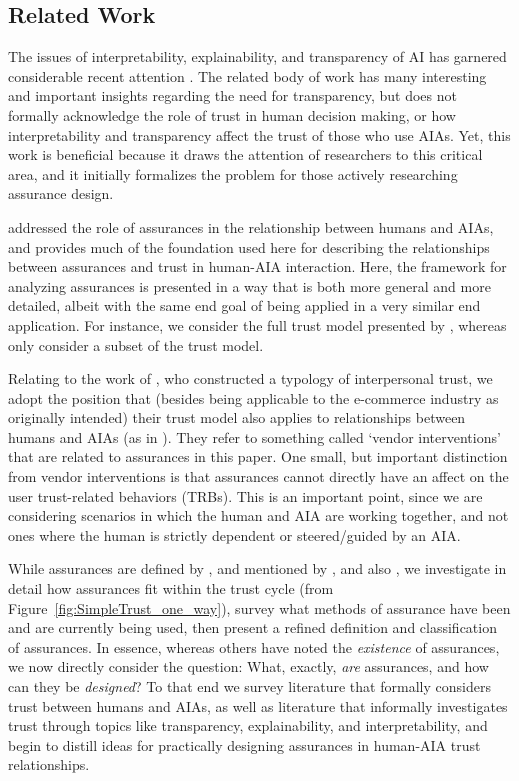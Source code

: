 \subsection{Related Work}\label{sec:rel_work}
    The issues of interpretability, explainability, and transparency of AI has garnered considerable recent attention \cite{Doshi-Velez2017-xy, Weller2017-zx, Lipton2016-ug, Gunning2017-ih}. The related body of work has many interesting and important insights regarding the need for transparency, but does not formally acknowledge the role of trust in human decision making, or how interpretability and transparency affect the trust of those who use AIAs. Yet, this work is beneficial because it draws the attention of researchers to this critical area, and it initially formalizes the problem for those actively researching assurance design.

    \citet{Lillard2016-yg} addressed the role of assurances in the relationship between humans and AIAs, and provides much of the foundation used here for describing the relationships between assurances and trust in human-AIA interaction. Here, the framework for analyzing assurances is presented in a way that is both more general and more detailed, albeit with the same end goal of being applied in a very similar end application. For instance, we consider the full trust model presented by \citet{McKnight2001-fa}, whereas \citeauthor{Lillard2016-yg} only consider a subset of the trust model.

    Relating to the work of \citet{McKnight2001-fa}, who constructed a typology of interpersonal trust, we adopt the position that (besides being applicable to the e-commerce industry as originally intended) their trust model also applies to relationships between humans and AIAs (as in \cite{Lillard2016-yg}). They refer to something called `vendor interventions' that are related to assurances in this paper. One small, but important distinction from vendor interventions is that assurances cannot directly have an affect on the user trust-related behaviors (TRBs). This is an important point, since we are considering scenarios in which the human and AIA are working together, and not ones where the human is strictly dependent or steered/guided by an AIA. 
    
    While assurances are defined by \citeauthor{Lillard2016-yg}, and mentioned by \citeauthor{McKnight2001-fa}, and also \citeauthor{Corritore2003-gx}, we investigate in detail how assurances fit within the trust cycle (from Figure~\ref{fig:SimpleTrust_one_way}), survey what methods of assurance have been and are currently being used, then present a refined definition and classification of assurances. In essence, whereas others have noted the \textit{existence} of assurances, we now directly consider the question: What, exactly, \textit{are} assurances, and how can they be \textit{designed}? To that end we survey literature that formally considers trust between humans and AIAs, as well as literature that informally investigates trust through topics like transparency, explainability, and interpretability, and begin to distill ideas for practically designing assurances in human-AIA trust relationships. 

